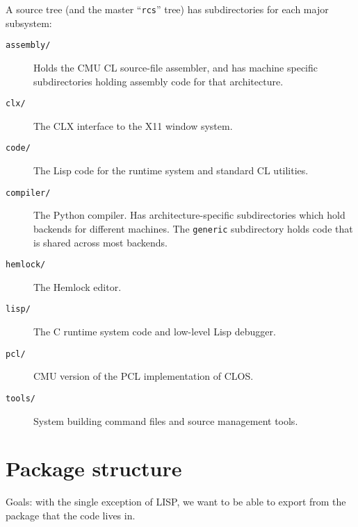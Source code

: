 A source tree (and the master ``{\tt rcs}'' tree) has subdirectories for each
major subsystem:
\begin{description}
\item[{\tt assembly/}] Holds the CMU CL source-file assembler, and has machine
specific subdirectories holding assembly code for that architecture.

\item[{\tt clx/}] The CLX interface to the X11 window system.

\item[{\tt code/}] The Lisp code for the runtime system and standard CL
utilities.

\item[{\tt compiler/}] The Python compiler.  Has architecture-specific
subdirectories which hold backends for different machines.  The {\tt generic}
subdirectory holds code that is shared across most backends.

\item[{\tt hemlock/}] The Hemlock editor.

\item[{\tt lisp/}] The C runtime system code and low-level Lisp debugger.

\item[{\tt pcl/}] CMU version of the PCL implementation of CLOS.

\item[{\tt tools/}] System building command files and source management tools.
\end{description}


\section{Package structure}

Goals: with the single exception of LISP, we want to be able to export from the
package that the code lives in.

